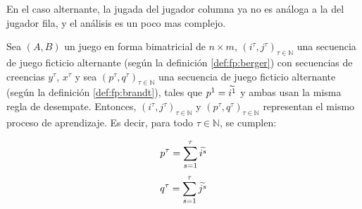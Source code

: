 En el caso alternante, la jugada del jugador columna ya no es análoga a la del jugador fila, y el análisis es un poco mas complejo.

\begin{lemma}
    Sea $(A, B)$ un juego en forma bimatricial de $n \times m$, $(i^\tau, j^\tau)_{\tau \in \mathbb{N}}$ una secuencia de juego ficticio alternante (según la definición \ref{def:fp:berger}) con secuencias de creencias $y^\tau$, $x^\tau$ y sea $(p^\tau, q^\tau)_{\tau \in \mathbb{N}}$ una secuencia de juego ficticio alternante (según la definición \ref{def:fp:brandt}), tales que $p^1 = \widetilde{i^1}$ y ambas usan la misma regla de desempate. Entonces, $(i^\tau, j^\tau)_{\tau \in \mathbb{N}}$ y $(p^\tau, q^\tau)_{\tau \in \mathbb{N}}$ representan el mismo proceso de aprendizaje. Es decir, para todo $\tau \in \mathbb{N}$, se cumplen:

    \[ p^{\tau} = \sum_{s=1}^\tau{\widetilde{i^s}} \]
    \[ q^{\tau} = \sum_{s=1}^\tau{\widetilde{j^s}} \]

\end{lemma}
